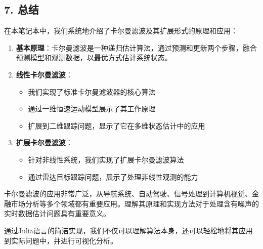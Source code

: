 \documentclass[11pt]{article}
\providecommand{\tightlist}{%
      \setlength{\itemsep}{0pt}\setlength{\parskip}{0pt}}
\begin{document}
    \subsection{7. 总结}\label{ux603bux7ed3}

在本笔记本中，我们系统地介绍了卡尔曼滤波及其扩展形式的原理和应用：

\begin{enumerate}
\def\labelenumi{\arabic{enumi}.}
\item
  \textbf{基本原理}：卡尔曼滤波是一种递归估计算法，通过预测和更新两个步骤，融合预测模型和观测数据，以最优方式估计系统状态。
\item
  \textbf{线性卡尔曼滤波}：

  \begin{itemize}
  \tightlist
  \item
    我们实现了标准卡尔曼滤波器的核心算法
  \item
    通过一维恒速运动模型展示了其工作原理
  \item
    扩展到二维跟踪问题，显示了它在多维状态估计中的应用
  \end{itemize}
\item
  \textbf{扩展卡尔曼滤波}：

  \begin{itemize}
  \tightlist
  \item
    针对非线性系统，我们实现了扩展卡尔曼滤波算法
  \item
    通过雷达目标跟踪问题，展示了处理非线性观测的能力
  \end{itemize}
\end{enumerate}

卡尔曼滤波的应用非常广泛，从导航系统、自动驾驶、信号处理到计算机视觉、金融市场分析等多个领域都有重要应用。理解其原理和实现方法对于处理含有噪声的实时数据估计问题具有重要意义。

通过Julia语言的简洁实现，我们不仅可以理解算法本身，还可以轻松地将其应用到实际问题中，并进行可视化分析。


    
    
    
\end{document}
